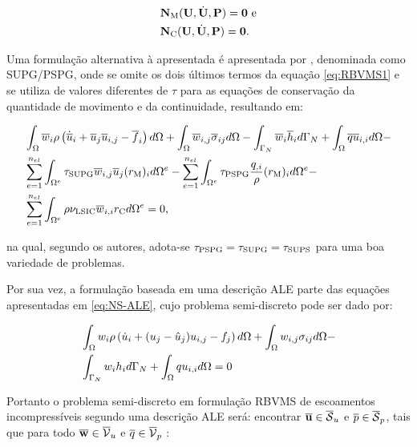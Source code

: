\documentclass[_ArquivoPrincipal.tex]{subfiles}
\begin{document}
\begin{subequations}
    \begin{align}
         & \mathbf{N}_\mathrm{M}(\mathbf{U},\dot{\mathbf{U}},\mathbf{P})=\mathbf{0}\text{ e} \\
         & \mathbf{N}_\mathrm{C}(\mathbf{U},\dot{\mathbf{U}},\mathbf{P})=\mathbf{0}\text{.}
    \end{align}
\end{subequations}

Uma formulação alternativa à apresentada é apresentada por , denominada como SUPG/PSPG, onde se omite os dois últimos termos da equação \ref{eq:RBVMS1} e se utiliza de valores diferentes de $\tau$ para as equações de conservação da quantidade de movimento e da continuidade, resultando em:

\begin{equation}
    \begin{split}
        &\int_{\Omega}{\overline{w}_i\rho\left({\dot{\overline{u}}_i+\overline{u}_j\overline{u}_{i,j}-\overline{f}_i}\right) d\Omega}+\int_{\Omega}{\overline{w}_{i,j}\overline{\sigma}_{ij} d\Omega}-\int_{\Gamma_N}{\overline{w}_i\overline{h}_i d\Gamma_N}+\int_{\Omega}{\overline{q}\overline{u}_{i,i} d\Omega}-\\
        &\sum_{e=1}^{n_{el}}{\int_{\Omega^e}{\tau_{\mathrm{SUPG}}\overline{w}_{i,j}\overline{u}_j(r_\mathrm{M})_{i} d\Omega^e}}-\sum_{e=1}^{n_{el}}{\int_{\Omega^e}{\tau_{\mathrm{PSPG}}\frac{q_{,i}}{\rho}(r_\mathrm{M})_{i} d\Omega^e}}-\\
        &\sum_{e=1}^{n_{el}}{\int_{\Omega^e}{\rho\nu_{\mathrm{LSIC}}\overline{w}_{i,i}r_\mathrm{C} d\Omega^e}}=0
        \text{,}
        \label{eq:SUPG-PSPG}
    \end{split}
\end{equation}

\noindent na qual, segundo os autores, adota-se $\tau_{\mathrm{PSPG}}=\tau_{\mathrm{SUPG}}=\tau_{\mathrm{SUPS}}$ para uma boa variedade de problemas.

Por sua vez, a formulação baseada em uma descrição ALE parte das equações apresentadas em \ref{eq:NS-ALE}, cujo problema semi-discreto pode ser dado por:

\begin{equation}
    \begin{split}
        &\int_{\Omega}{w_i\rho\left({\dot{u}_i+(u_j-\hat{u}_j)u_{i,j}-f_j}\right) d\Omega}+\int_{\Omega}{w_{i,j}\sigma_{ij} d\Omega}-\\
        &\int_{\Gamma_N}{w_ih_i d\Gamma_N}+\int_{\Omega}{qu_{i,i} d\Omega}=0
    \end{split}
\end{equation}

Portanto o problema semi-discreto em formulação RBVMS de escoamentos incompressíveis segundo uma descrição ALE será: encontrar $\overline{\mathbf{u}}\in\overline{\mathcal{S}}_u$ e $\overline{p}\in\overline{\mathcal{S}}_p$, tais que para todo $\overline{\mathbf{w}}\in\overline{\mathcal{V}}_u$ e $\overline{q}\in\overline{\mathcal{V}}_p$ \cite{bazilevs2013computational}:
\end{document}
